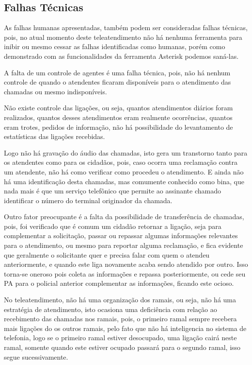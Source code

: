 \subsection{Falhas Técnicas}
As falhas humanas apresentadas, também podem ser consideradas falhas técnicas, pois, no atual momento deste teleatendimento não há nenhuma ferramenta para inibir ou mesmo cessar as falhas identificadas como humanas, porém como demonstrado com as funcionalidades da ferramenta Asterisk podemos saná-las.

A falta de um controle de agentes é uma falha técnica, pois, não há nenhum controle de quando o atendentes ficaram disponíveis para o atendimento das chamadas ou mesmo indisponíveis.

Não existe controle das ligações, ou seja, quantos atendimentos diários foram realizados, quantos desses atendimentos eram realmente ocorrências, quantos eram trotes, pedidos de informação, não há possibilidade do levantamento de estatísticas das ligações recebidas.

Logo não há gravação do áudio das chamadas, isto gera um transtorno tanto para os atendentes como para os cidadãos, pois, caso ocorra uma reclamação contra um atendente, não há como verificar como procedeu o atendimento. E ainda não há uma identificação desta chamadas, mas comumente conhecido como bina, que nada mais é que um serviço telefônico que permite ao assinante chamado identificar o número do terminal originador da chamada.

Outro fator preocupante é a falta da possibilidade de transferência de chamadas, pois, foi verificado que é comum um cidadão retornar a ligação, seja para complementar a solicitação, passar ou repassar algumas informações relevantes para o atendimento, ou mesmo para reportar alguma reclamação, e fica evidente que geralmente o solicitante quer e precisa falar com quem o atendeu anteriormente, e quando este liga novamente acaba sendo atendido por outro. Isso torna-se oneroso pois coleta as informações e repassa posteriormente, ou cede seu PA para o policial anterior complementar as informações, ficando este ocioso.

No teleatendimento, não há uma organização dos ramais, ou seja, não há uma estratégia de atendimento, isto ocasiona uma deficiência com relação ao recebimento das chamadas nos ramais, pois, o primeiro ramal sempre recebera mais ligações do os outros ramais, pelo fato que não há inteligencia no sistema de telefonia, logo se o primeiro ramal estiver desocupado, uma ligação cairá neste ramal, somente quando este estiver ocupado passará para o segundo ramal, isso segue sucessivamente.

